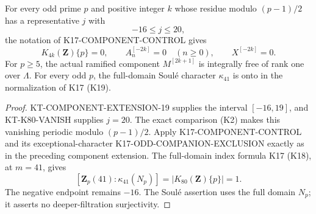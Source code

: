 \begin{corollary}
For every odd prime $p$ and positive integer $k$ whose residue
modulo $(p-1)/2$ has a representative $j$ with
\[
                              -16\leq j\leq20,
\]
the notation of K17-COMPONENT-CONTROL gives
\[
 K_{4k}(\mathbf Z)\{p\}=0,\qquad
 A_n^{[-2k]}=0\quad(n\geq0),\qquad X^{[-2k]}=0.
\]
For $p\geq5$, the actual ramified component $M^{[2k+1]}$
is integrally free of rank one over $\Lambda$.
For every odd $p$, the full-domain Soul\'e character
$\kappa_{41}$ is onto in the normalization of K17 (K19).
\end{corollary}
\begin{proof}
KT-COMPONENT-EXTENSION-19 supplies the interval $[-16,19]$,
and KT-K80-VANISH supplies $j=20$.
The exact comparison (K2) makes this vanishing periodic
modulo $(p-1)/2$.  Apply K17-COMPONENT-CONTROL and its
exceptional-character K17-ODD-COMPANION-EXCLUSION exactly
as in the preceding component extension.  The full-domain
index formula K17 (K18), at $m=41$, gives
\[
 [\mathbf Z_p(41):\kappa_{41}(N_p)]
                  =|K_{80}(\mathbf Z)\{p\}|=1.
\]
The negative endpoint remains $-16$.  The Soul\'e assertion
uses the full domain $N_p$; it asserts no deeper-filtration
surjectivity.
\end{proof}

